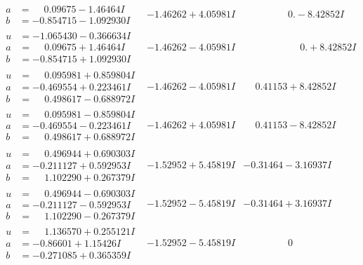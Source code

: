 \documentclass[1p]{elsarticle_modified}
\theoremstyle{definition}
\begin{document}
$$\begin{array}{c|c|c}
\begin{aligned}
a &= \phantom{-}0.09675 - 1.46464 I \\
b &= -0.854715 - 1.092930 I\end{aligned}
 & -1.46262 + 4.05981 I & \phantom{-0.000000 } 0. - 8.42852 I \\ \hline\begin{aligned}
u &= -1.065430 - 0.366634 I \\
a &= \phantom{-}0.09675 + 1.46464 I \\
b &= -0.854715 + 1.092930 I\end{aligned}
 & -1.46262 - 4.05981 I & \phantom{-0.000000 -}0. + 8.42852 I \\ \hline\begin{aligned}
u &= \phantom{-}0.095981 + 0.859804 I \\
a &= -0.469554 + 0.223461 I \\
b &= \phantom{-}0.498617 - 0.688972 I\end{aligned}
 & -1.46262 - 4.05981 I & \phantom{-}0.41153 + 8.42852 I \\ \hline\begin{aligned}
u &= \phantom{-}0.095981 - 0.859804 I \\
a &= -0.469554 - 0.223461 I \\
b &= \phantom{-}0.498617 + 0.688972 I\end{aligned}
 & -1.46262 + 4.05981 I & \phantom{-}0.41153 - 8.42852 I \\ \hline\begin{aligned}
u &= \phantom{-}0.496944 + 0.690303 I \\
a &= -0.211127 + 0.592953 I \\
b &= \phantom{-}1.102290 + 0.267379 I\end{aligned}
 & -1.52952 + 5.45819 I & -0.31464 - 3.16937 I \\ \hline\begin{aligned}
u &= \phantom{-}0.496944 - 0.690303 I \\
a &= -0.211127 - 0.592953 I \\
b &= \phantom{-}1.102290 - 0.267379 I\end{aligned}
 & -1.52952 - 5.45819 I & -0.31464 + 3.16937 I \\ \hline\begin{aligned}
u &= \phantom{-}1.136570 + 0.255121 I \\
a &= -0.86601 + 1.15426 I \\
b &= -0.271085 + 0.365359 I\end{aligned}
 & -1.52952 - 5.45819 I & \phantom{-0.000000 } 0 \\ \hline\begin{aligned}

\end{aligned}
\end{array}$$
\end{document}
